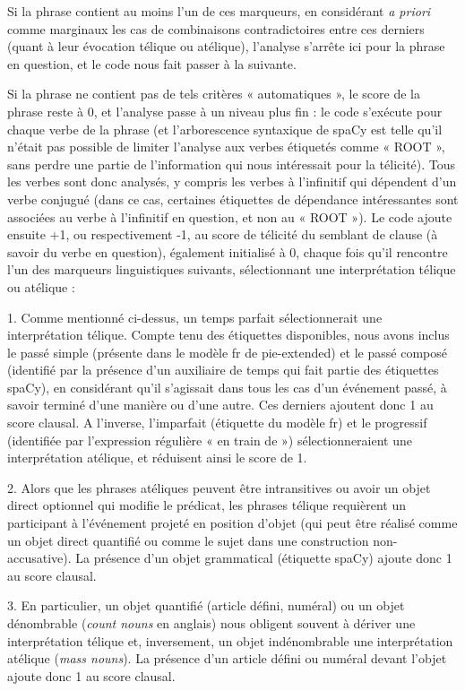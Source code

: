 Si la phrase contient au moins l’un de ces marqueurs, en considérant \textit{ a priori} comme marginaux les cas de combinaisons contradictoires entre ces derniers (quant à leur évocation télique ou atélique), l'analyse s'arrête ici pour la phrase en question, et le code nous fait passer à la suivante.

Si la phrase ne contient pas de tels critères « automatiques », le score de la phrase reste à 0, et l'analyse passe à un niveau plus fin : le code s'exécute pour chaque verbe de la phrase (et l'arborescence syntaxique de spaCy est telle qu'il n'était pas possible de limiter l'analyse aux verbes étiquetés comme « ROOT », sans perdre une partie de l'information qui nous intéressait pour la télicité). Tous les verbes sont donc analysés, y compris les verbes à l'infinitif qui dépendent d'un verbe conjugué (dans ce cas, certaines étiquettes de dépendance intéressantes sont associées au verbe à l'infinitif en question, et non au « ROOT »). Le code ajoute ensuite +1, ou respectivement -1, au score de télicité du semblant de clause (à savoir du verbe en question), également initialisé à 0, chaque fois qu'il rencontre l'un des marqueurs linguistiques suivants, sélectionnant une interprétation télique ou atélique : 

1. Comme mentionné ci-dessus, un temps parfait sélectionnerait une interprétation télique. Compte tenu des étiquettes disponibles, nous avons inclus le passé simple (présente dans le modèle fr de pie-extended) et le passé composé (identifié par la présence d'un auxiliaire de temps qui fait partie des étiquettes spaCy), en considérant qu’il s’agissait dans tous les cas d'un événement passé, à savoir terminé d'une manière ou d'une autre. Ces derniers ajoutent donc 1 au score clausal. A l'inverse, l'imparfait (étiquette du modèle fr) et le progressif (identifiée par l'expression régulière « en train de ») sélectionneraient une interprétation atélique, et réduisent ainsi le score de 1.

2. Alors que les phrases atéliques peuvent être intransitives ou avoir un objet direct optionnel qui modifie le prédicat, les phrases télique requièrent un participant à l'événement projeté en position d'objet (qui peut être réalisé comme un objet direct quantifié ou comme le sujet dans une construction non-accusative). La présence d'un objet grammatical (étiquette spaCy) ajoute donc 1 au score clausal.

3. En particulier, un objet quantifié (article défini, numéral) ou un objet dénombrable (\textit{count nouns} en anglais) nous obligent souvent à dériver une interprétation télique et, inversement, un objet indénombrable une interprétation atélique (\textit{mass nouns}). La présence d'un article défini ou numéral devant l'objet ajoute donc 1 au score clausal.

